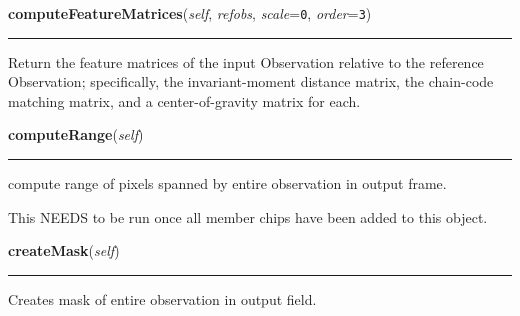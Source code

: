     \begin{boxedminipage}{\textwidth}

    \raggedright \textbf{computeFeatureMatrices}(\textit{self}, \textit{refobs}, \textit{scale}=\texttt{0\-}, \textit{order}=\texttt{3\-})

    \vspace{-1.5ex}

    \rule{\textwidth}{0.5\fboxrule}
    Return the feature matrices of the input Observation relative to the 
    reference Observation; specifically, the invariant-moment distance 
    matrix, the chain-code matching matrix, and a center-of-gravity 
    matrix for each.

    \vspace{1ex}

    \end{boxedminipage}

    \label{multireg:chipwavelets:Observation:computeRange}
    \vspace{0.5ex}

    \begin{boxedminipage}{\textwidth}

    \raggedright \textbf{computeRange}(\textit{self})

    \vspace{-1.5ex}

    \rule{\textwidth}{0.5\fboxrule}
    compute range of pixels spanned by entire observation in output 
    frame.

    This NEEDS to be run once all member chips have been added to this 
    object.

    \vspace{1ex}

    \end{boxedminipage}

    \label{multireg:chipwavelets:Observation:createMask}
    \vspace{0.5ex}

    \begin{boxedminipage}{\textwidth}

    \raggedright \textbf{createMask}(\textit{self})

    \vspace{-1.5ex}

    \rule{\textwidth}{0.5\fboxrule}
    Creates mask of entire observation in output field.

    \vspace{1ex}

    \end{boxedminipage}

